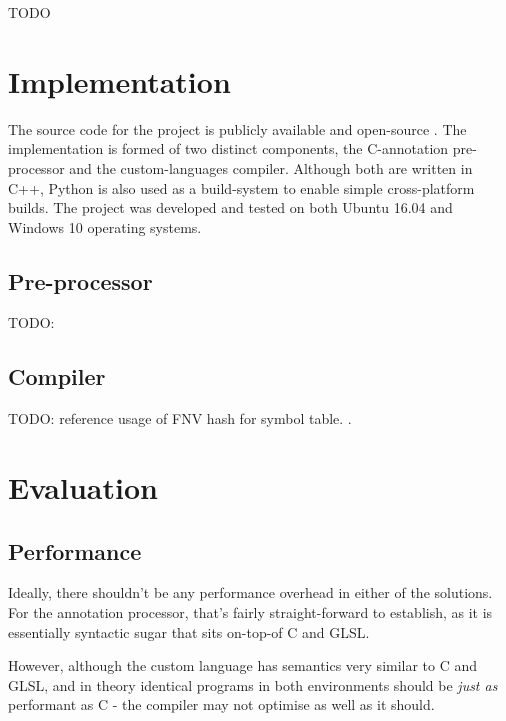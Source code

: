 \documentclass[a4paper,12pt,twoside,openright]{report}
\begin{document}
TODO

\chapter{Implementation}


The source code for the project is publicly available and open-source
\cite{ProjectSource}. The implementation is formed of two distinct components,
the C-annotation pre-processor and the custom-languages compiler. Although both
are written in C++, Python is also used as a build-system to enable simple
cross-platform builds. The project was developed and tested on both Ubuntu
16.04 and Windows 10 operating systems.


\section{Pre-processor}

TODO:

\section{Compiler}

TODO: reference usage of FNV hash for symbol table. \cite{FNVHash}.


\chapter{Evaluation}



\section{Performance}

Ideally, there shouldn't be any performance overhead in either of the
solutions. For the annotation processor, that's fairly straight-forward to
establish, as it is essentially syntactic sugar that sits on-top-of C and GLSL.

However, although the custom language has semantics very similar to C and GLSL,
and in theory identical programs in both environments should be \textit{just
as} performant as C - the compiler may not optimise as well as it should.
\end{document}
